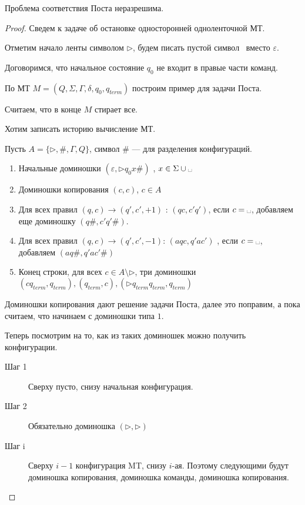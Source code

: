 \begin{thm}[Пост, 1946]
    Проблема соответствия Поста неразрешима.
\end{thm}
\begin{proof}
    Сведем к задаче об остановке односторонней одноленточной МТ.

	Отметим начало ленты символом $ \triangleright$, будем писать пустой символ \textvisiblespace\,  вместо  $ \varepsilon $.

	Договоримся, что начальное состояние $  q_0$ не входит в правые части команд.

	По МТ $ M = (Q, \Sigma, \Gamma, \delta , q_0, q_{term})$ построим пример для задачи Поста.

	Считаем, что в конце $ M$ стирает все.

	Хотим записать историю вычисление МТ.

	Пусть $ A = \{\triangleright, \#, \Gamma, Q\}$, символ $ \#$ --- для разделения конфигураций.

	\begin{enumerate}
		\item Начальные доминошки $ ( \varepsilon , \triangleright q_0 x \#)$ , $ x \in \Sigma \cup \text{\textvisiblespace}$
		\item Доминошки копирования $ (c, c)$, $ c \in A $ 
		\item  Для всех правил $ (q, c) \to  (q', c', +1)$ : $(qc, c'q')$, если $ c = \text{\textvisiblespace}$, добавляем еще доминошку $ (q\# , c'q'\#)$.
		\item Для всех правил $ (q, c) \to  (q', c', -1)$: $ (aqc, q'ac')$ , если $ c = \text{\textvisiblespace}$, добавляем $ (aq\#, q'ac'\#)$ 
		\item Конец строки, для всех $ c \in A \setminus \triangleright$, три доминошки
			$ (cq_{term}, q_{term}), (q_{term}, c), (\triangleright q_{term}q_{term}, q_{term})$
	\end{enumerate} 

	\begin{note}
	    Доминошки копирования дают решение задачи Поста, далее это поправим, а пока считаем, что начинаем с доминошки типа $ 1$.
	\end{note}

	Теперь посмотрим на то, как из таких доминошек можно получить конфигурации.
	\begin{description}
		\item[Шаг 1] Сверху пусто, снизу начальная конфигурация.
		\item[Шаг 2] Обязательно доминошка $ (\triangleright, \triangleright)$ 
		\item[Шаг i] Сверху $ i-1$ конфигурация MT, снизу  $ i$-ая. Поэтому следующими будут доминошка копирования, доминошка команды, доминошка копирования.
	\end{description}


\end{proof}

